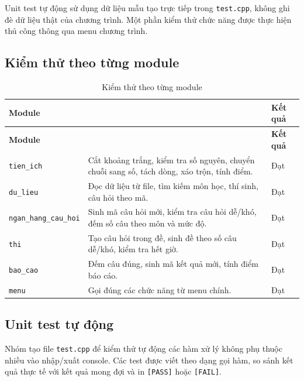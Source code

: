 \documentclass[12pt,a4paper]{report}
\begin{document}
Unit test tự động sử dụng dữ liệu mẫu tạo trực tiếp trong \texttt{test.cpp}, không ghi đè dữ liệu thật của chương trình. Một phần kiểm thử chức năng được thực hiện thủ công thông qua menu chương trình.

\subsection{Kiểm thử theo từng module}

\begin{longtable}{|>{\Centering\arraybackslash}p{}|>{\RaggedRight\arraybackslash}p{}|>{\Centering\arraybackslash}p{}|}
\caption{Kiểm thử theo từng module}\label{tab:kiem-thu-module}\\
\hline
\textbf{Module} & \multicolumn{1}{>{\Centering\arraybackslash}p{0.44\textwidth}|}{\textbf{Nội dung kiểm thử}} & \textbf{Kết quả} \\
\hline
\endfirsthead
\hline
\textbf{Module} & \multicolumn{1}{>{\Centering\arraybackslash}p{0.44\textwidth}|}{\textbf{Nội dung kiểm thử}} & \textbf{Kết quả} \\
\hline
\endhead
\texttt{tien\_ich} & Cắt khoảng trắng, kiểm tra số nguyên, chuyển chuỗi sang số, tách dòng, xáo trộn, tính điểm. & Đạt \\
\hline
\texttt{du\_lieu} & Đọc dữ liệu từ file, tìm kiếm môn học, thí sinh, câu hỏi theo mã. & Đạt \\
\hline
\texttt{ngan\_hang\_cau\_hoi} & Sinh mã câu hỏi mới, kiểm tra câu hỏi dễ/khó, đếm số câu theo môn và mức độ. & Đạt \\
\hline
\texttt{thi} & Tạo câu hỏi trong đề, sinh đề theo số câu dễ/khó, kiểm tra hết giờ. & Đạt \\
\hline
\texttt{bao\_cao} & Đếm câu đúng, sinh mã kết quả mới, tính điểm báo cáo. & Đạt \\
\hline
\texttt{menu} & Gọi đúng các chức năng từ menu chính. & Đạt \\
\hline
\end{longtable}

\subsection{Unit test tự động}

Nhóm tạo file \texttt{test.cpp} để kiểm thử tự động các hàm xử lý không phụ thuộc nhiều vào nhập/xuất console. Các test được viết theo dạng gọi hàm, so sánh kết quả thực tế với kết quả mong đợi và in \texttt{[PASS]} hoặc \texttt{[FAIL]}.
\end{document}
